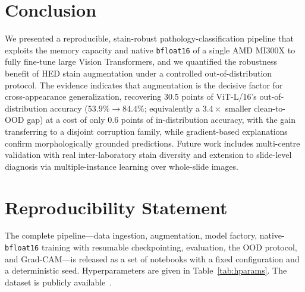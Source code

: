 \documentclass[11pt]{article}
\begin{document}
\section{Conclusion}
We presented a reproducible, stain-robust pathology-classification pipeline that exploits the memory
capacity and native \texttt{bfloat16} of a single AMD MI300X to fully fine-tune large Vision
Transformers, and we quantified the robustness benefit of HED stain augmentation under a controlled
out-of-distribution protocol. The evidence indicates that augmentation is the decisive factor for
cross-appearance generalization, recovering 30.5 points of ViT-L/16's out-of-distribution accuracy
($53.9\%\rightarrow84.4\%$; equivalently a $3.4\times$ smaller clean-to-OOD gap) at a cost of only
0.6 points of in-distribution accuracy, with the gain transferring to a disjoint corruption family,
while gradient-based explanations confirm morphologically grounded predictions. Future work includes
multi-centre validation with real inter-laboratory stain diversity and extension to slide-level
diagnosis via multiple-instance learning over whole-slide images.

\section*{Reproducibility Statement}
The complete pipeline---data ingestion, augmentation, model factory, native-\texttt{bfloat16}
training with resumable checkpointing, evaluation, the OOD protocol, and Grad-CAM---is released as a
set of notebooks with a fixed configuration and a deterministic seed. Hyperparameters are given in
Table~\ref{tab:hparams}. The dataset is publicly available~\citep{kather2018dataset}.



\end{document}
